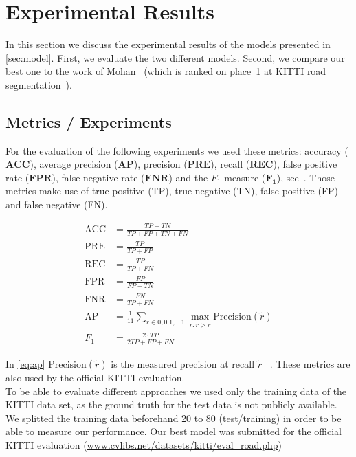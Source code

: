 
\section{Experimental Results}\label{sec:evaluation}

In this section we discuss the experimental results of the models
presented in \cref{sec:model}. First, we evaluate the two different
models. Second, we compare our best one to the work of
Mohan~\cite{Tarel2009} (which is ranked on place~1 at KITTI road
segmentation~\cite{Tarel2009}).


\subsection{Metrics / Experiments}



For the evaluation of the following experiments we used these metrics:
accuracy ($\mathbf{ACC}$), average precision ($\mathbf{AP}$), precision ($\mathbf{PRE}$),  recall ($\mathbf{REC}$), false positive rate ($\mathbf{FPR}$),  false negative rate ($\mathbf{FNR}$)
and the $F_1$-measure ($\mathbf{F_1}$), see~.
Those metrics make use of true positive (TP), true negative (TN), false positive (FP) and false negative (FN).

\begin{align} \label{eq:accuracy}
\text{ACC} &= \frac{TP + TN}{TP + FP + TN + FN}\\
\text{PRE} &= \frac{TP}{TP + FP}\label{eq:precision}\\
\text{REC} &= \frac{TP}{TP + FN}\label{eq:recall}\\
\text{FPR} &= \frac{FP}{FP + TN} \label{eq:fpr}\\
\text{FNR} &= \frac{FN}{TP+ FN}\label{eq:fnr}\\
\text{AP} &= \frac{1}{11} \displaystyle\sum_{r \in 0,0.1,\dots 1} \max_{\tilde{r}: \tilde{r} > r} \text{Precision}(\tilde{r})\label{eq:ap}\\
F_1 &= \frac{2 \cdot TP}{2TP +FP +FN}\label{eq:fMeasure}
\end{align}

%
In \cref{eq:ap}  $\text{Precision}(\tilde{r})$ is the measured precision at recall $\tilde{r}$ ~\cite{everingham2010pascal}. These metrics are also used by the official KITTI evaluation. \\
To be able to evaluate different approaches we used only the
training data of the KITTI data set, as the ground truth for the test data is
not publicly available. We splitted the training data beforehand 20 to 80
(test/training) in order to be able to measure our performance. Our best model
was submitted for the official KITTI evaluation
(\href{http://www.cvlibs.net/datasets/kitti/eval_road.php}{www.cvlibs.net/datasets/kitti/eval\_road.php})\\

